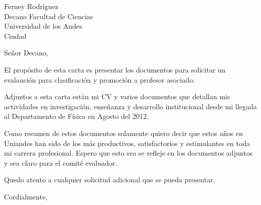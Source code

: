 \documentclass[letterpaper]{scrlttr2}
\begin{document}
\begin{letter}{%
Ferney Rodr\'iguez\\
Decano Facultad de Ciencias\\
Universidad de los Andes\\
Ciudad
}

\opening{Se\~nor Decano,}


El prop\'osito de esta carta es presentar los documentos para
solicitar un evalauci\'on para clasificaci\'on y promoci\'on a
profesor asociado. 

Adjuntos a esta carta est\'an mi CV y varios documentos que detallan mis
actividades en investigaci\'on, ense\~nanza y desarrollo
institucional desde mi llegada al Departamento de F\'isica en Agosto
del 2012. 

Como resumen de estos documentos solamente quiero decir que estos
a\~nos en Uniandes han sido de los m\'as productivos, satisfactorios
y estimulantes en toda mi carrera profesional. Espero que esto sea
se refleje en los documentos adjuntos y sea claro para el comit\'e
evaluador. 


Quedo atento a cualquier solicitud adicional que se pueda presentar.

\closing{Cordialmente,}

\end{letter}
\end{document}
